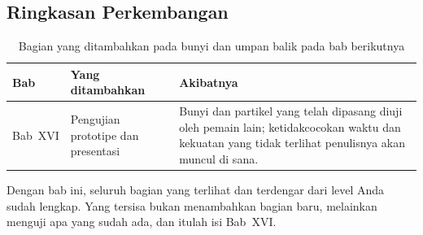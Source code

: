 \subsection{Ringkasan Perkembangan}

\begin{table}[htbp]
\centering
\caption{Bagian yang ditambahkan pada bunyi dan umpan balik pada bab berikutnya}
\label{tab:perkembangan-bunyi}
{\setlength{\tabcolsep}{4pt}\footnotesize%
\begin{tabularx}{\textwidth}{@{}C{1.6cm} L{5.0cm} Y@{}}
\toprule
\headrow \textbf{Bab} & \textbf{Yang ditambahkan} & \textbf{Akibatnya} \\
\midrule
Bab~XVI & Pengujian prototipe dan presentasi &
Bunyi dan partikel yang telah dipasang diuji oleh pemain lain; ketidakcocokan
waktu dan kekuatan yang tidak terlihat penulisnya akan muncul di sana. \\
\bottomrule
\end{tabularx}}
\end{table}

Dengan bab ini, seluruh bagian yang terlihat dan terdengar dari level Anda
sudah lengkap. Yang tersisa bukan menambahkan bagian baru, melainkan menguji
apa yang sudah ada, dan itulah isi Bab~XVI.
